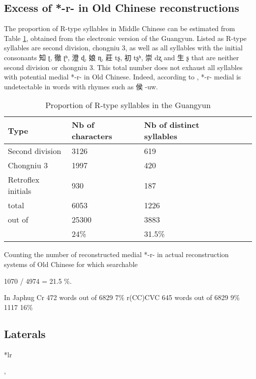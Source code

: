 \documentclass[oldfontcommands,oneside,a4paper,11pt]{article}
\newcommand{\ipa}[1]{{\phon \mbox{#1}}} %
\newcommand{\zh}[1]{{\cn #1}}
\begin{document}
\subsection{Excess of *-r- in Old Chinese reconstructions}
The proportion of R-type syllables in Middle Chinese can be estimated from Table \ref{tab:gy}, obtained from the electronic version of the Guangyun. Listed as R-type syllables are second division, chongniu 3, as well as all syllables with the initial consonants \zh{知} \ipa{ʈ}, \zh{徹} \ipa{ʈʰ},  \zh{澄} \ipa{ɖ},  \zh{娘} \ipa{ɳ},  \zh{莊} \ipa{tʂ},  \zh{初} \ipa{tʂʰ},  \zh{崇} \ipa{dʐ} and \zh{生} \ipa{ʂ} that are neither second division or chongniu 3. This total number does not exhaust all syllables with potential medial *\ipa{-r-} in Old Chinese. Indeed, according to  \citet[501]{baxter92}, *\ipa{-r-} medial is undetectable in words with rhymes such as \zh{侯} \ipa{-uw}. 

\begin{table}
\caption{Proportion of R-type syllables in the Guangyun} \label{tab:gy} \centering
\begin{tabular}{lllll}
\toprule
Type& Nb of characters & Nb of distinct syllables \\
\midrule
Second division	& 3126	 & 619 \\
Chongniu 3	& 1997	& 420 \\
Retroflex initials & 930	& 187 \\
\midrule
total&	6053	&1226\\
out of &	25300	&3883 \\
	&24\%	&31.5\% \\
	\bottomrule
\end{tabular}
\end{table}


Counting the number of reconstructed medial *\ipa{-r-} in actual reconstruction systems of Old Chinese for which searchable 

1070 / 4974 = 21.5 \%.

In Japhug
Cr 472 words out of 6829 7\%
r(CC)CVC 645 words out of 6829 9\%
1117 16\%
\subsection{Laterals}

*lr

\citet[217-225]{starostin89}, \citet[36-40]{sagart99roc}
\citet[78]{baroni14invariant}
\end{document}

